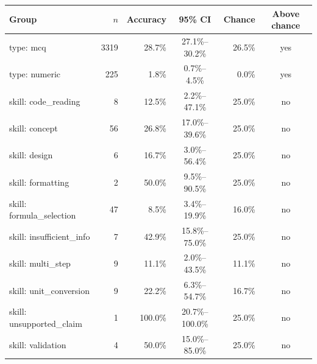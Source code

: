 \begin{tabular}{lrrcrc}
\toprule
Group & $n$ & Accuracy & 95\% CI & Chance & Above chance \\
\midrule
type: mcq & 3319 & 28.7\% & 27.1\%--30.2\% & 26.5\% & yes \\
type: numeric & 225 & 1.8\% & 0.7\%--4.5\% & 0.0\% & yes \\
skill: code\_reading & 8 & 12.5\% & 2.2\%--47.1\% & 25.0\% & no \\
skill: concept & 56 & 26.8\% & 17.0\%--39.6\% & 25.0\% & no \\
skill: design & 6 & 16.7\% & 3.0\%--56.4\% & 25.0\% & no \\
skill: formatting & 2 & 50.0\% & 9.5\%--90.5\% & 25.0\% & no \\
skill: formula\_selection & 47 & 8.5\% & 3.4\%--19.9\% & 16.0\% & no \\
skill: insufficient\_info & 7 & 42.9\% & 15.8\%--75.0\% & 25.0\% & no \\
skill: multi\_step & 9 & 11.1\% & 2.0\%--43.5\% & 11.1\% & no \\
skill: unit\_conversion & 9 & 22.2\% & 6.3\%--54.7\% & 16.7\% & no \\
skill: unsupported\_claim & 1 & 100.0\% & 20.7\%--100.0\% & 25.0\% & no \\
skill: validation & 4 & 50.0\% & 15.0\%--85.0\% & 25.0\% & no \\
\bottomrule
\end{tabular}

